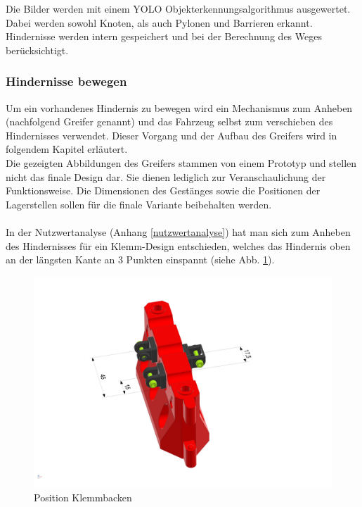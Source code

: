 Die Bilder werden mit einem YOLO Objekterkennungsalgorithmus ausgewertet. Dabei werden sowohl Knoten, als auch Pylonen und Barrieren erkannt. Hindernisse werden intern gespeichert und bei der Berechnung des Weges berücksichtigt.


\newpage

\subsubsection{Hindernisse bewegen}
\label{subsubsection:Hindernisse bewegen}

Um ein vorhandenes Hindernis zu bewegen wird ein Mechanismus zum Anheben (nachfolgend Greifer genannt) und das Fahrzeug selbst zum verschieben des Hindernisses verwendet. Dieser Vorgang und der Aufbau des Greifers wird in folgendem Kapitel erläutert.\\

 Die gezeigten Abbildungen des Greifers stammen von einem Prototyp und stellen nicht das finale Design dar. Sie dienen lediglich zur Veranschaulichung der Funktionsweise. Die Dimensionen des Gestänges sowie die Positionen der Lagerstellen sollen für die finale Variante beibehalten werden.\\
 \\
In der Nutzwertanalyse (Anhang \ref{nutzwertanalyse}) hat man sich zum Anheben des Hindernisses für ein Klemm-Design entschieden, welches das Hindernis oben an der längsten Kante an 3 Punkten einspannt (siehe Abb. \ref{fig:obstacle_clamping_concept}). 


\begin{figure}[H]
\centering
\includegraphics[width=0.95\linewidth]{assets/greifer-prototyp/Greifer_Backen_Trimetric.png} 
\caption{Position Klemmbacken}
\label{fig:obstacle_clamping_concept}
\end{figure}


